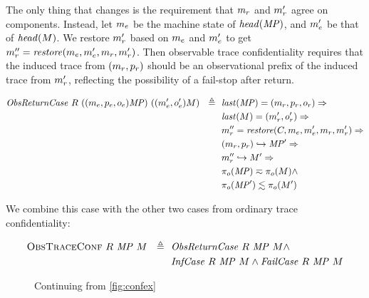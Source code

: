 \documentclass[acmsmall,review,anonymous]{acmart}\settopmatter{printfolios=true,printccs=false,printacmref=false}
\begin{document}
{{      The only thing that changes is the requirement that \(m_r\)
      and \(m_r'\) agree on components. Instead, let \(m_e\)
      be the machine state of \(\mathit{head}(\mathit{MP})\), and \(m_e'\) be
      that of \(\mathit{head}(M)\). We restore \(m_r'\) based on
      \(m_e\) and \(m_e'\) to get \(m_r'' =
      \mathit{restore}(m_e,m_e',m_r,m_r')\).  Then
      observable trace confidentiality requires that the
      induced trace from \((m_r,p_r)\) should be an
      observational prefix of the induced trace from \(m_r'\),
      reflecting the possibility of a fail-stop after return.

      \[\begin{split}
        \mathit{ObsReturnCase} ~ R ~
        ((m_e,p_e,o_e)\mathit{MP}) ~
        ((m_e',o_e')M) \ \ \triangleq \ \
        & \mathit{last}(\mathit{MP}) = (m_r,p_r,o_r) \Rightarrow \\
        & \mathit{last}(M) = (m_r',o_r') \Rightarrow \\
        & m_r'' = \mathit{restore}(C,m_e,m_e',m_r,m_r') \Rightarrow\\
        & (m_r,p_r) \hookrightarrow \mathit{MP}' \Rightarrow \\
        & m_r'' \hookrightarrow M' \Rightarrow \\
        & \pi_o(\mathit{MP}) \eqsim \pi_o(M) \land \\
        & \pi_o(\mathit{MP}') \lesssim \pi_o(M') \\
      \end{split}\]

      We combine this case with the other two cases from ordinary trace
      confidentiality:

      \[\begin{split}
        \text{\sc ObsTraceConf} ~  R ~ \mathit{MP} ~ M \ \ \triangleq \ \
        & \mathit{ObsReturnCase} ~ R ~ \mathit{MP} ~ M \land \\
        & \mathit{InfCase} ~ R ~ \mathit{MP} ~ M \land \mathit{FailCase} ~ R ~
          \mathit{MP} ~ M \\
      \end{split}\]

      \begin{figure}
        \confidentialitylazyexample
        \caption{Continuing from \cref{fig:confex}}
        \label{fig:conflex}
      \end{figure}

}}
\end{document}
